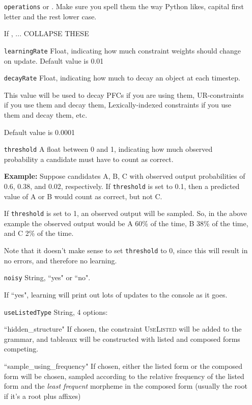 \documentclass[12]{article}
\begin{document}
\begin{itemize}
	\item[\texttt{operations}]  	 or .  Make sure you spell them the way Python likes, capital first letter and the rest lower case.
	
	If , ...  COLLAPSE THESE
	
	\item[\texttt{learningRate}] Float, indicating how much constraint weights should change on update.  Default value is 0.01
	
	\item[\texttt{decayRate}] Float, indicating how much to decay an object at each timestep.
	
	This value will be used to decay PFCs if you are using them, UR-constraints if you use them and decay them, Lexically-indexed constraints if you use them and decay them, etc.
	
	Default value is 0.0001
	
	\item[\texttt{threshold}] A float between 0 and 1, indicating how much observed probability a candidate must have to count as correct.
	
	{\bf Example:} Suppose candidates A, B, C with observed output probabilities of 0.6, 0.38, and 0.02, respectively.  If \texttt{threshold} is set to 0.1, then a predicted value of A or B would count as correct, but not C.
	
	If \texttt{threshold} is set to 1, an observed output will be sampled.  So, in the above example the observed output would be A 60\% of the time, B 38\% of the time, and C 2\% of the time.
	
	Note that it doesn't make sense to set \texttt{threshold} to 0, since this will result in no errors, and therefore no learning.
	
	\item[\texttt{noisy}]  String, ``yes" or ``no".
	
	If ``yes", learning will print out lots of updates to the console as it goes.
	
	\item[\texttt{useListedType}] String, 4 options:
	
	``hidden\_structure"  If chosen, the constraint \textsc{UseListed} will be added to the grammar, and tableaux will be constructed with listed and composed forms competing.
	
	``sample\_using\_frequency"  If chosen, either the listed form or the composed form will be chosen, sampled according to the relative frequency of the listed form and the {\it least frequent} morpheme in the composed form (usually the root if it's a root plus affixes)
	

\end{itemize}
\end{document}
